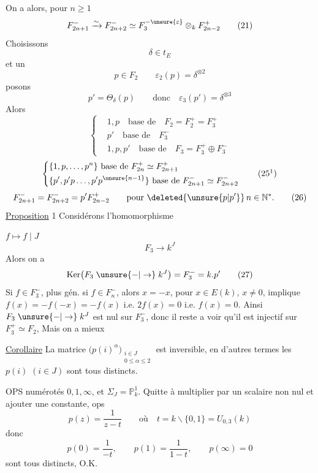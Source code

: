 On a alors, pour  $n\geq1$
\[
 F_{2n+1}^-\xrightarrow{\sim}F_{2n+2}^-\simeq F_3^{-\unsure{\varepsilon}}\otimes_k F_{2n-2}^+ \tag*{(21)}
\]
Choisissons
\[
 \delta\in t_E \tag*{(22)}
\]
et un
\[
 p\in F_2\qquad \varepsilon_2(p)=\delta^{\otimes2} \tag*{(23)}
\]
posons
\[
 p'=\Theta_\delta(p)\qquad\text{donc}\quad \varepsilon_3(p')=\delta^{\otimes3} \tag*{(24)}
\]
Alors
\[
 \left\{\begin{aligned}
 &1,p\quad\text{base de}\quad F_2=F_2^+=F_3^+\\
 &p'\quad\text{base de}\quad F_3^-\\
 &1,p,p'\quad\text{base de}\quad F_3=F_3^+\oplus F_3^-
 \end{aligned}\right. \tag*{(25)}
\]
\[
 \left\{\begin{aligned}
 &\{1,p,\ldots,p^n\}\ \text{base de}\ F_{2n}^+\simeq F_{2n+1}^+\\
 &\{p',p'p\ldots,p'p^{\unsure{n-1}}\}\ \text{base de}\ F_{2n+1}^-\simeq F_{2n+2}^-
 \end{aligned}\right. \tag*{$(25^1)$}
\]
\[
 F_{2n+1}^-=F_{2n+2}^-=p'F_{2n-2}^+\qquad\text{pour }\deleted{\unsure{p|p'}}\,n\in\mathbb N^*. \tag*{(26)}
\]
\uline{Proposition} 1 Considérons l'homomorphisme

$f\longmapsto f\mid J$
\[
 F_3\longrightarrow k^J
\]
Alors on a
\[
 \operatorname{Ker}\bigl(F_3\mathrel{\unsure{-|\to}} k^J\bigr)=F_3^-=k.p' \tag*{(27)}
\]
Si $f\in F_3^-$, plus gén. si $f\in F_n^-$, alors $x=-x$, pour $x\in E(k)$, $x\ne0$, implique $f(x)=-f(-x)=-f(x)$ i.e. $2f(x)=0$ i.e. $f(x)=0$. Ainsi $F_3\mathrel{\unsure{-|\to}}k^{J}$ est nul sur $F_3^-$, donc il reste a voir qu'il est injectif sur $F_3^+\simeq F_2$, Mais on a mieux

\uline{Corollaire} La matrice   $\bigl(p(i)^\alpha\bigr)_{\substack{i\in J\\0\leq\alpha\leq2}}$ est inversible, en d'autres termes les $p(i)$ $(i\in J)$ sont tous distincts.

OPS   numérotés $0,1,\infty$, et $\Sigma_J=\mathbb P^1_k$. Quitte à multiplier par un scalaire non nul et ajouter une constante, ops
\[
 p(z)=\frac1{z-t}\qquad\text{où}\quad t=k\smallsetminus\{0,1\}=U_{0,3}(k)
\]
donc
\[
 p(0)=\frac1{-t},\qquad p(1)=\frac1{1-t},\qquad p(\infty)=0
\]
sont tous distincts, O.K.

